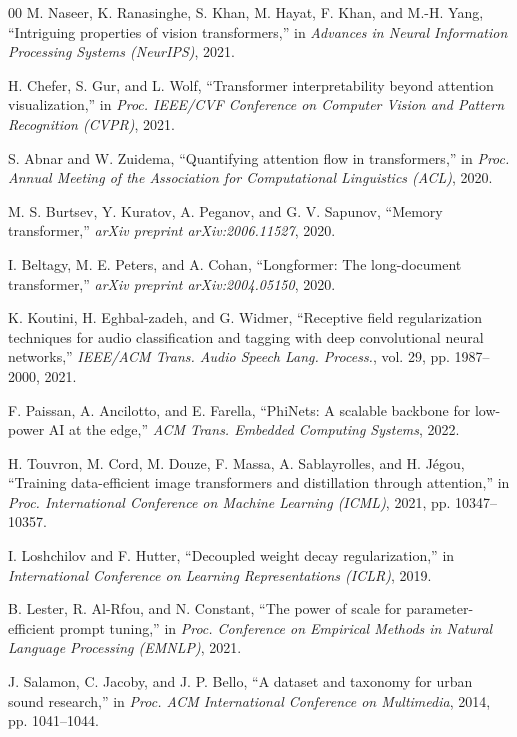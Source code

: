 \documentclass[conference]{IEEEtran}
\begin{document}
\begin{thebibliography}{00}
M. Naseer, K. Ranasinghe, S. Khan, M. Hayat, F. Khan, and M.-H. Yang, ``Intriguing properties of vision transformers,'' in \emph{Advances in Neural Information Processing Systems (NeurIPS)}, 2021.

H. Chefer, S. Gur, and L. Wolf, ``Transformer interpretability beyond attention visualization,'' in \emph{Proc. IEEE/CVF Conference on Computer Vision and Pattern Recognition (CVPR)}, 2021.

S. Abnar and W. Zuidema, ``Quantifying attention flow in transformers,'' in \emph{Proc. Annual Meeting of the Association for Computational Linguistics (ACL)}, 2020.

M. S. Burtsev, Y. Kuratov, A. Peganov, and G. V. Sapunov, ``Memory transformer,'' \emph{arXiv preprint arXiv:2006.11527}, 2020.

I. Beltagy, M. E. Peters, and A. Cohan, ``Longformer: The long-document transformer,'' \emph{arXiv preprint arXiv:2004.05150}, 2020.

K. Koutini, H. Eghbal-zadeh, and G. Widmer, ``Receptive field regularization techniques for audio classification and tagging with deep convolutional neural networks,'' \emph{IEEE/ACM Trans. Audio Speech Lang. Process.}, vol. 29, pp. 1987--2000, 2021.

F. Paissan, A. Ancilotto, and E. Farella, ``PhiNets: A scalable backbone for low-power AI at the edge,'' \emph{ACM Trans. Embedded Computing Systems}, 2022.

H. Touvron, M. Cord, M. Douze, F. Massa, A. Sablayrolles, and H. J\'egou, ``Training data-efficient image transformers and distillation through attention,'' in \emph{Proc. International Conference on Machine Learning (ICML)}, 2021, pp. 10347--10357.

I. Loshchilov and F. Hutter, ``Decoupled weight decay regularization,'' in \emph{International Conference on Learning Representations (ICLR)}, 2019.

B. Lester, R. Al-Rfou, and N. Constant, ``The power of scale for parameter-efficient prompt tuning,'' in \emph{Proc. Conference on Empirical Methods in Natural Language Processing (EMNLP)}, 2021.

J. Salamon, C. Jacoby, and J. P. Bello, ``A dataset and taxonomy for urban sound research,'' in \emph{Proc. ACM International Conference on Multimedia}, 2014, pp. 1041--1044.


\end{thebibliography}
\end{document}
